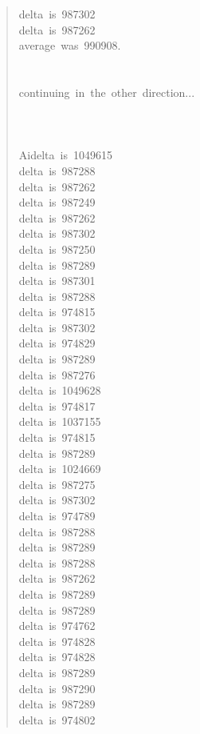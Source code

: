 \documentclass[letterpaper]{article}
\begin{document}
\begin{quote}
{delta~is~987302\\
delta~is~987262\\
average~was~990908.\\
~\\
~\\
continuing~in~the~other~direction...\\
~\\
~\\
~\\
Aidelta~is~1049615\\
delta~is~987288\\
delta~is~987262\\
delta~is~987249\\
delta~is~987262\\
delta~is~987302\\
delta~is~987250\\
delta~is~987289\\
delta~is~987301\\
delta~is~987288\\
delta~is~974815\\
delta~is~987302\\
delta~is~974829\\
delta~is~987289\\
delta~is~987276\\
delta~is~1049628\\
delta~is~974817\\
delta~is~1037155\\
delta~is~974815\\
delta~is~987289\\
delta~is~1024669\\
delta~is~987275\\
delta~is~987302\\
delta~is~974789\\
delta~is~987288\\
delta~is~987289\\
delta~is~987288\\
delta~is~987262\\
delta~is~987289\\
delta~is~987289\\
delta~is~974762\\
delta~is~974828\\
delta~is~974828\\
delta~is~987289\\
delta~is~987290\\
delta~is~987289\\
delta~is~974802\\
}
\end{quote}
\end{document}
